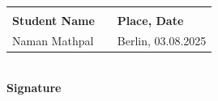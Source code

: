 \documentclass[12pt, a4paper, oneside]{report}
\begin{document}
\vspace{2cm}

\noindent
\begin{tabular}{p{6cm}p{2cm}p{6cm}}
    \hrulefill & & \hrulefill \\
    \textbf{Student Name} & & \textbf{Place, Date} \\
    Naman Mathpal & & Berlin, 03.08.2025 \\
\end{tabular}

\vspace{2cm}

\noindent
\hrulefill \\
\textbf{Signature}
\end{document}
